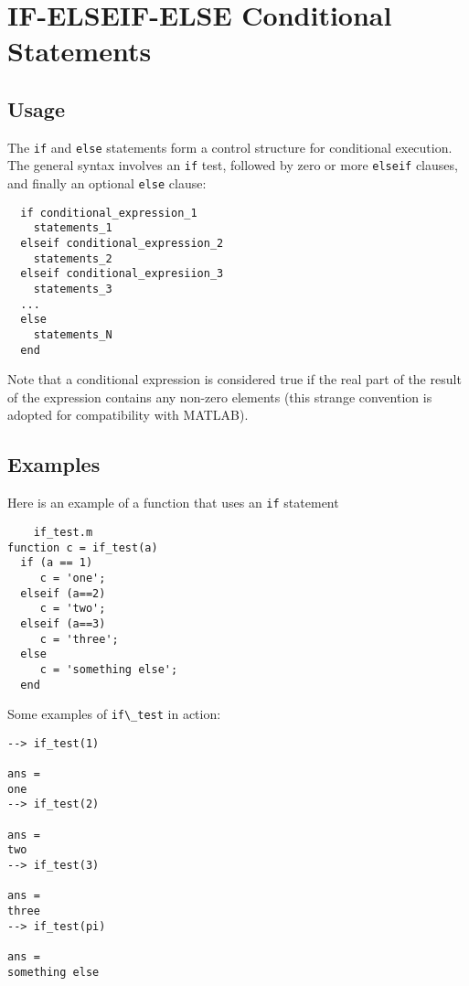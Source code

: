 \section{IF-ELSEIF-ELSE Conditional Statements}

\subsection{Usage}

The \verb|if| and \verb|else| statements form a control structure for
conditional execution.  The general syntax involves an \verb|if|
test, followed by zero or more \verb|elseif| clauses, and finally
an optional \verb|else| clause:
\begin{verbatim}
  if conditional_expression_1
    statements_1
  elseif conditional_expression_2
    statements_2
  elseif conditional_expresiion_3
    statements_3
  ...
  else
    statements_N
  end
\end{verbatim}
Note that a conditional expression is considered true if 
the real part of the result of the expression contains
any non-zero elements (this strange convention is adopted
for compatibility with MATLAB).
\subsection{Examples}

Here is an example of a function that uses an \verb|if| statement
\begin{verbatim}
    if_test.m
function c = if_test(a)
  if (a == 1)
     c = 'one';
  elseif (a==2)
     c = 'two';
  elseif (a==3)
     c = 'three';
  else
     c = 'something else';
  end
\end{verbatim}
Some examples of \verb|if\_test| in action:
\begin{verbatim}
--> if_test(1)

ans = 
one
--> if_test(2)

ans = 
two
--> if_test(3)

ans = 
three
--> if_test(pi)

ans = 
something else
\end{verbatim}
